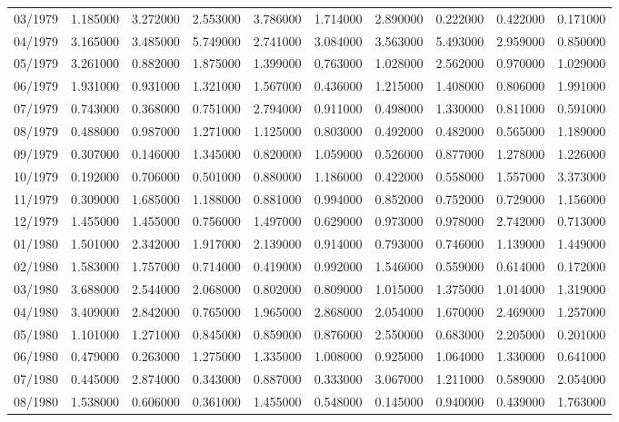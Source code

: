 \begin{tabular}{lrrrrrrrrr}
03/1979 & 1.185000 & 3.272000 & 2.553000 & 3.786000 & 1.714000 & 2.890000 & 0.222000 & 0.422000 & 0.171000 \\
04/1979 & 3.165000 & 3.485000 & 5.749000 & 2.741000 & 3.084000 & 3.563000 & 5.493000 & 2.959000 & 0.850000 \\
05/1979 & 3.261000 & 0.882000 & 1.875000 & 1.399000 & 0.763000 & 1.028000 & 2.562000 & 0.970000 & 1.029000 \\
06/1979 & 1.931000 & 0.931000 & 1.321000 & 1.567000 & 0.436000 & 1.215000 & 1.408000 & 0.806000 & 1.991000 \\
07/1979 & 0.743000 & 0.368000 & 0.751000 & 2.794000 & 0.911000 & 0.498000 & 1.330000 & 0.811000 & 0.591000 \\
08/1979 & 0.488000 & 0.987000 & 1.271000 & 1.125000 & 0.803000 & 0.492000 & 0.482000 & 0.565000 & 1.189000 \\
09/1979 & 0.307000 & 0.146000 & 1.345000 & 0.820000 & 1.059000 & 0.526000 & 0.877000 & 1.278000 & 1.226000 \\
10/1979 & 0.192000 & 0.706000 & 0.501000 & 0.880000 & 1.186000 & 0.422000 & 0.558000 & 1.557000 & 3.373000 \\
11/1979 & 0.309000 & 1.685000 & 1.188000 & 0.881000 & 0.994000 & 0.852000 & 0.752000 & 0.729000 & 1.156000 \\
12/1979 & 1.455000 & 1.455000 & 0.756000 & 1.497000 & 0.629000 & 0.973000 & 0.978000 & 2.742000 & 0.713000 \\
01/1980 & 1.501000 & 2.342000 & 1.917000 & 2.139000 & 0.914000 & 0.793000 & 0.746000 & 1.139000 & 1.449000 \\
02/1980 & 1.583000 & 1.757000 & 0.714000 & 0.419000 & 0.992000 & 1.546000 & 0.559000 & 0.614000 & 0.172000 \\
03/1980 & 3.688000 & 2.544000 & 2.068000 & 0.802000 & 0.809000 & 1.015000 & 1.375000 & 1.014000 & 1.319000 \\
04/1980 & 3.409000 & 2.842000 & 0.765000 & 1.965000 & 2.868000 & 2.054000 & 1.670000 & 2.469000 & 1.257000 \\
05/1980 & 1.101000 & 1.271000 & 0.845000 & 0.859000 & 0.876000 & 2.550000 & 0.683000 & 2.205000 & 0.201000 \\
06/1980 & 0.479000 & 0.263000 & 1.275000 & 1.335000 & 1.008000 & 0.925000 & 1.064000 & 1.330000 & 0.641000 \\
07/1980 & 0.445000 & 2.874000 & 0.343000 & 0.887000 & 0.333000 & 3.067000 & 1.211000 & 0.589000 & 2.054000 \\
08/1980 & 1.538000 & 0.606000 & 0.361000 & 1.455000 & 0.548000 & 0.145000 & 0.940000 & 0.439000 & 1.763000 \\

\end{tabular}
